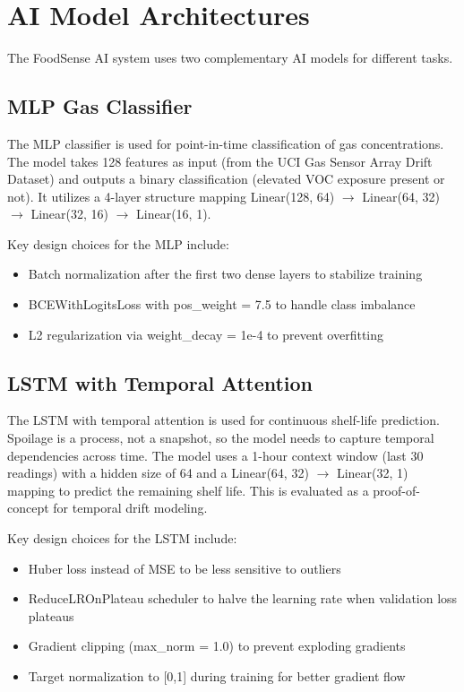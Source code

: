 \section{AI Model Architectures}
The FoodSense AI system uses two complementary AI models for different tasks.

\subsection{MLP Gas Classifier}
The MLP classifier is used for point-in-time classification of gas concentrations. The model takes 128 features as input (from the UCI Gas Sensor Array Drift Dataset) and outputs a binary classification (elevated VOC exposure present or not). It utilizes a 4-layer structure mapping Linear(128, 64) $\rightarrow$ Linear(64, 32) $\rightarrow$ Linear(32, 16) $\rightarrow$ Linear(16, 1).

Key design choices for the MLP include:
\begin{itemize}
    \item Batch normalization after the first two dense layers to stabilize training
    \item BCEWithLogitsLoss with pos\_weight = 7.5 to handle class imbalance
    \item L2 regularization via weight\_decay = 1e-4 to prevent overfitting
\end{itemize}

\subsection{LSTM with Temporal Attention}
The LSTM with temporal attention is used for continuous shelf-life prediction. Spoilage is a process, not a snapshot, so the model needs to capture temporal dependencies across time. The model uses a 1-hour context window (last 30 readings) with a hidden size of 64 and a Linear(64, 32) $\rightarrow$ Linear(32, 1) mapping to predict the remaining shelf life. This is evaluated as a proof-of-concept for temporal drift modeling.

Key design choices for the LSTM include:
\begin{itemize}
    \item Huber loss instead of MSE to be less sensitive to outliers
    \item ReduceLROnPlateau scheduler to halve the learning rate when validation loss plateaus
    \item Gradient clipping (max\_norm = 1.0) to prevent exploding gradients
    \item Target normalization to [0,1] during training for better gradient flow
\end{itemize}

